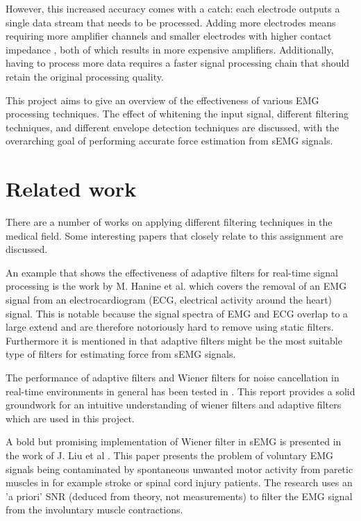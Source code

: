 However, this increased accuracy comes with a catch: each electrode outputs a single data stream that needs to be processed. Adding more electrodes means requiring more amplifier channels and smaller electrodes with higher contact impedance \cite{electrode_size_impedance}, both of which results in more expensive amplifiers. Additionally, having to process more data requires a faster signal processing chain that should retain the original processing quality.

This project aims to give an overview of the effectiveness of various EMG processing techniques. The effect of whitening the input signal, different filtering techniques, and different envelope detection techniques are discussed, with the overarching goal of performing accurate force estimation from sEMG signals.

\section{Related work}
There are a number of works on applying different filtering techniques in the medical field. Some interesting papers that closely relate to this assignment are discussed.

An example that shows the effectiveness of adaptive filters for real-time signal processing is the work by M. Hanine et al. \cite{adaptive_filter_emg_noise_cancellation_ecg} which covers the removal of an EMG signal from an electrocardiogram (ECG, electrical activity around the heart) signal. This is notable because the signal spectra of EMG and ECG overlap to a large extend and are therefore notoriously hard to remove using static filters. Furthermore it is mentioned in \cite{influence_semg_amplitude_estimation_technique_on_emg_force_relationship} that adaptive filters might be the most suitable type of filters for estimating force from sEMG signals.

The performance of adaptive filters and Wiener filters for noise cancellation in real-time environments in general has been tested in \cite{wiener_vs_adaptive_realtime_noisecancellation}. This report provides a solid groundwork for an intuitive understanding of wiener filters and adaptive filters which are used in this project.

A bold but promising implementation of Wiener filter in sEMG is presented in the work of J. Liu et al \cite{wiener_filter_a_priori_semg}. This paper presents the problem of voluntary EMG signals being contaminated by spontaneous unwanted motor activity from paretic muscles in for example stroke or spinal cord injury patients. The research uses an 'a priori' SNR (deduced from theory, not measurements) to filter the EMG signal from the involuntary muscle contractions. 

